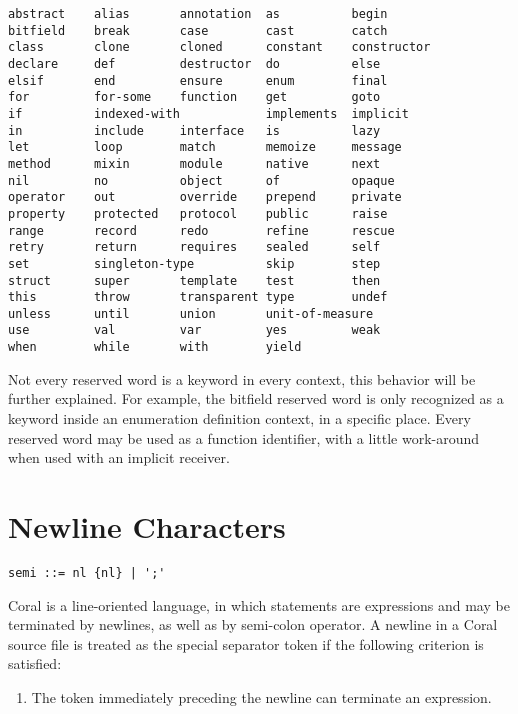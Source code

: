 \begin{lstlisting}
abstract    alias       annotation  as          begin
bitfield    break       case        cast        catch
class       clone       cloned      constant    constructor
declare     def         destructor  do          else
elsif       end         ensure      enum        final
for         for-some    function    get         goto
if          indexed-with            implements  implicit
in          include     interface   is          lazy
let         loop        match       memoize     message
method      mixin       module      native      next
nil         no          object      of          opaque
operator    out         override    prepend     private
property    protected   protocol    public      raise
range       record      redo        refine      rescue
retry       return      requires    sealed      self
set         singleton-type          skip        step
struct      super       template    test        then
this        throw       transparent type        undef
unless      until       union       unit-of-measure
use         val         var         yes         weak
when        while       with        yield
\end{lstlisting}

Not every reserved word is a keyword in every context, this behavior will be further explained. For example, the bitfield reserved word is only recognized as a keyword inside an enumeration definition context, in a specific place. Every reserved word may be used as a function identifier, with a little work-around when used with an implicit receiver.

\section{Newline Characters}\label{sec:newlinecharacters}

\syntax\begin{lstlisting}
semi ::= nl {nl} | ';'
\end{lstlisting}

Coral is a line-oriented language, in which statements are expressions and may be terminated by newlines, as well as by semi-colon operator. A newline in a Coral source file is treated as the special separator token \lstinline@nl@ if the following criterion is satisfied:

\begin{enumerate}
\item The token immediately preceding the newline can terminate an expression.
\end{enumerate}

